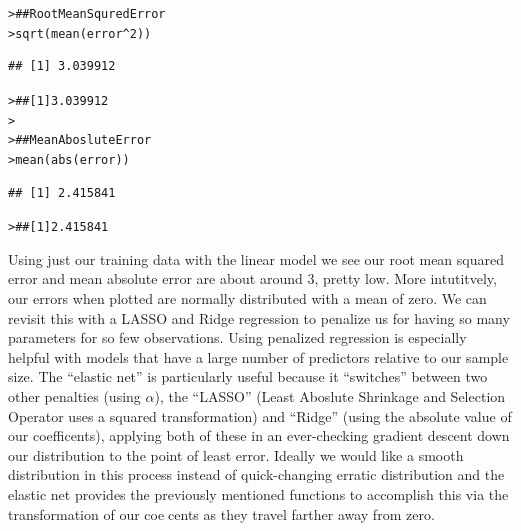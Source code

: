 \documentclass[12pt]{article}\usepackage[]{graphicx}\usepackage[]{color}
\makeatletter
\newcommand{\hlnum}[1]{\textcolor[rgb]{0.82,0.78,0.62}{#1}}%
\newcommand{\hlcom}[1]{\textcolor[rgb]{0.404,0.408,0.42}{#1}}%
\newcommand{\hlopt}[1]{\textcolor[rgb]{0.882,0.878,0.898}{#1}}%
\newcommand{\hlstd}[1]{\textcolor[rgb]{0.882,0.878,0.898}{#1}}%
\newcommand{\hlkwd}[1]{\textcolor[rgb]{0.733,0.388,0.812}{#1}}%
\newenvironment{kframe}{%
 \def\at@end@of@kframe{}%
 \ifinner\ifhmode%
  \def\at@end@of@kframe{\end{minipage}}%
  \begin{minipage}{\columnwidth}%
 \fi\fi%
 \def\FrameCommand##1{\hskip\@totalleftmargin \hskip-\fboxsep
 \colorbox{shadecolor}{##1}\hskip-\fboxsep
     \hskip-\linewidth \hskip-\@totalleftmargin \hskip\columnwidth}%
 \MakeFramed {\advance\hsize-\width
   \@totalleftmargin\z@ \linewidth\hsize
   \@setminipage}}%
 {\par\unskip\endMakeFramed%
 \at@end@of@kframe}
\newenvironment{knitrout}{}{} %
\makeatother
\begin{document}
\begin{flushleft}
\begin{center}
\begin{knitrout}
\end{knitrout}
\end{center}

\begin{knitrout}
\color{fgcolor}\begin{kframe}
\begin{alltt}
\hlstd{> }\hlcom{## Root Mean Squred Error}
\hlstd{> }\hlkwd{sqrt}\hlstd{(}\hlkwd{mean}\hlstd{(error}\hlopt{^}\hlnum{2}\hlstd{))}
\end{alltt}
\begin{verbatim}
## [1] 3.039912
\end{verbatim}
\begin{alltt}
\hlstd{> }\hlcom{## [1] 3.039912}
\hlstd{> }
\hlstd{> }\hlcom{## Mean Aboslute Error}
\hlstd{> }\hlkwd{mean}\hlstd{(}\hlkwd{abs}\hlstd{(error))}
\end{alltt}
\begin{verbatim}
## [1] 2.415841
\end{verbatim}
\begin{alltt}
\hlstd{> }\hlcom{## [1] 2.415841}
\end{alltt}
\end{kframe}
\end{knitrout}

Using just our training data with the linear model we see our root mean squared error and mean absolute error are about around 3, pretty low. More intutitvely, our errors when plotted are normally distributed with a mean of zero. We can revisit this with a LASSO and Ridge regression to penalize us for having so many parameters for so few observations. Using penalized regression is especially helpful with models that have a large number of predictors relative to our sample size. The ``elastic net'' is particularly useful because it ``switches'' between two other penalties (using $\alpha$), the ``LASSO'' (Least Aboslute Shrinkage and Selection Operator uses a squared transformation) and “Ridge” (using the absolute value of our coefficents), applying both of these in an ever-checking gradient descent down our distribution to the point of least error. Ideally we would like a smooth distribution in this process instead of quick-changing erratic distribution and the elastic net provides the previously mentioned functions to accomplish this via the transformation of our coecents as they travel farther away from zero.  








\end{flushleft}
\end{document}
